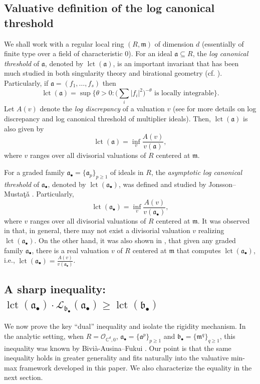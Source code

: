 \documentclass[12pt]{amsart}
\newcommand{\CC}{\mathbb{C}}
\newcommand{\m}{\mathfrak m}
\renewcommand{\a}{\mathfrak{a}}
\renewcommand{\b}{\mathfrak{b}}
\newcommand{\cO}{\mathcal{O}}
\newcommand{\lct}{\operatorname{\mathrm{lct}}}
\newcommand{\Loj}{\mathcal{L}} %
\newcommand{\abul}{{\a_\bullet}}
\newcommand{\bbul}{{\b_\bullet}}
\theoremstyle{plain}
\theoremstyle{definition}
\numberwithin{equation}{section}
\begin{document}
\subsection{Valuative definition of the log canonical threshold}
We shall work with a regular local ring $(R,\m)$ of dimension $d$ (essentially of finite type over a field of characteristic $0$). For an ideal $\a \subseteq R$, the \emph{log canonical threshold} of $\a$, denoted by $\lct(\a)$, is an important invariant that has been much studied in both singularity theory and birational geometry (cf. \cite{KollarSing,LazPosII}). Particularly, if $\a = (f_1, \dots, f_s)$ then
$$\lct(\a) = \sup\{\theta > 0 : \big(\sum_i|f_i|^2\big)^{-\theta} \text{ is locally integrable}\}.$$
Let $A(v)$ denote the \emph{log discrepancy} of a valuation $v$ (see \cite{BlickleLazarsfeld, KollarSing, LazPosII} for more details on log discrepancy and log canonical threshold of multiplier ideals). Then, $\lct(\a)$ is also given by 
$$\lct(\a) = \inf_v \frac{A(v)}{v(\a)},$$ 
where $v$ ranges over all divisorial valuations of $R$ centered at $\m$.

For a graded family $\abul = \{\a_p\}_{p \ge 1}$ of ideals in $R$, the \emph{asymptotic log canonical threshold} of $\abul$, denoted by $\lct(\abul)$, was defined and studied by Jonsson--Musta\c{t}\v{a} \cite{JM12}. Particularly, 
$$\lct(\abul) = \inf_v \frac{A(v)}{v(\abul)},$$
where $v$ ranges over all divisorial valuations of $R$ centered at $\m$. It was observed in \cite{JM12} that, in general, there may not exist a divisorial valuation $v$ realizing $\lct(\abul)$. On the other hand, it was also shown in \cite[Theorem A]{JM12}, that given any graded family $\abul$, there is a real valuation $v$ of $R$ centered at $\m$ that computes $\lct(\abul)$, i.e., $\lct(\abul) = \frac{A(v)}{v(\abul)}$.

\subsection{A sharp inequality: $\lct(\abul)\cdot \Loj_{\bbul}(\abul)\ge \lct(\bbul)$}

We now prove the key ``dual'' inequality and isolate the rigidity mechanism. In the analytic setting, when $R = \cO_{\CC^d,0}$, $\abul = \{\a^p\}_{p \ge 1}$ and $\bbul = \{\m^q\}_{q \ge 1}$, this inequality was known by Bivi\`a-Ausina--Fukui \cite{BF16}. Our point is that the same inequality holds in greater generality and fits naturally into the valuative min-max framework developed in this paper. We also characterize the equality in the next section.
\end{document}
